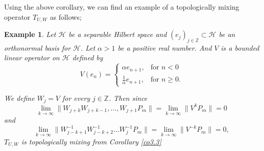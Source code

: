 \documentclass{article}
\newtheorem {example}[theorem]{Example}
\begin{document}
Using the above corollary, we can find an example of a topologically mixing operator $T_{U,W}$ as follows;

\begin{example}\label{ex3.4}
Let $\mathcal{H}$ be a separable Hilbert space and $(e_{j})_{j\in\mathbb{Z}}\subset\mathcal{H}$ be an orthonormal basis for $\mathcal{H}$. Let $\alpha>1$ be a positive real number. And $V$ is a bounded linear operator on $\mathcal{H}$ defined by
\begin{displaymath}
V(e_{n})=\left\{ \begin{array}{ll}
 \alpha e_{n+1}, & \textrm{for } n<0\\
 \frac{1}{\alpha}e_{n+1}, & \textrm{for } n\geq 0.
\end{array} \right.
\end{displaymath}

We define $W_{j}=V$ for every $j\in \mathbb{Z}$. Then since
\[\lim_{k\rightarrow\infty}\|W_{j+k}W_{j+k-1},...,W_{j+1}P_{m}\|= \lim_{k\rightarrow\infty}\|V^{k}P_{m}\|=0\]
and
\[\lim_{k\rightarrow\infty}\|W^{-1}_{j-k+1}W^{-1}_{j-k+2}...W^{-1}_{j}P_{m}\|= \lim_{k\rightarrow\infty}\|V^{-k}P_{m}\|=0,\]
$T_{U,W}$ is topologically mixing from Corollary \ref{co3.3}
\end{example}
\end{document}
